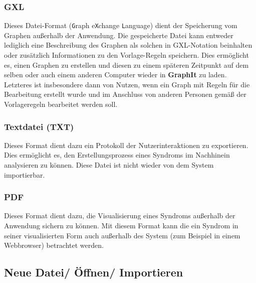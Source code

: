 \documentclass[enabledeprecatedfontcommands,fontsize=11pt,paper=a4,twoside]{scrartcl}
\newcounter{one}
\begin{document}
	\subsubsection{GXL}
	Dieses Datei-Format (\texttt{G}raph e\texttt{X}change \texttt{L}anguage) dient der Speicherung vom Graphen außerhalb der Anwendung. Die gespeicherte Datei kann entweder lediglich eine Beschreibung des Graphen als solchen in GXL-Notation beinhalten oder zusätzlich Informationen zu den Vorlage-Regeln speichern. Dies ermöglicht es, einen Graphen zu erstellen und diesen zu einem späteren Zeitpunkt auf dem selben oder auch einem anderen Computer wieder in \textbf{GraphIt} zu laden. Letzteres ist insbesondere dann von Nutzen, wenn ein Graph mit Regeln für die Bearbeitung erstellt wurde und im Anschluss von anderen Personen gemäß der Vorlageregeln bearbeitet werden soll.
	
	\subsubsection{Textdatei (TXT)}
	Dieses Format dient dazu ein Protokoll der Nutzerinteraktionen zu exportieren. Dies ermöglicht es, den Erstellungsprozess eines Syndroms im Nachhinein analysieren zu können. Diese Datei ist nicht wieder von dem System importierbar. 
	
	\subsubsection{PDF}
	Dieses Format dient dazu, die Visualisierung eines Syndroms außerhalb der Anwendung sichern zu können. Mit diesem Format kann die ein Syndrom in seiner visualisierten Form auch außerhalb des System (zum Beispiel in einem Webbrowser) betrachtet werden. 
	
\newpage	
\subsection{Neue Datei/ Öffnen/ Importieren} \label{import}
	
\end{document}
